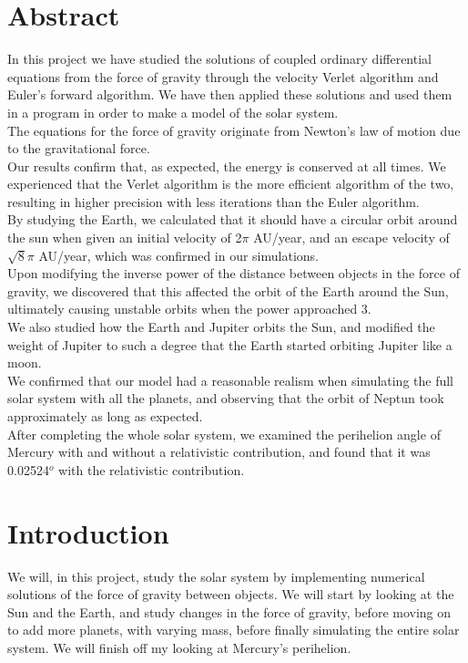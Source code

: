 \documentclass{article}
\begin{document}
\section*{Abstract}
    In this project we have studied the solutions of coupled ordinary differential equations from the force of gravity through the velocity Verlet algorithm and Euler's forward algorithm. We have then applied these solutions and used them in a program in order to make a model of the solar system.\\
    The equations for the force of gravity originate from Newton's law of motion due to the gravitational force.\\
    Our results confirm that, as expected, the energy is conserved at all times. We experienced that the Verlet algorithm is the more efficient algorithm of the two, resulting in higher precision with less iterations than the Euler algorithm.\\
    By studying the Earth, we calculated that it should have a circular orbit around the sun when given an initial velocity of 2$\pi$ AU/year, and an escape velocity of $\sqrt{8}\pi$ AU/year, which was confirmed in our simulations.\\
    Upon modifying the inverse power of the distance between objects in the force of gravity, we discovered that this affected the orbit of the Earth around the Sun, ultimately causing unstable orbits when the power approached 3.\\
    We also studied how the Earth and Jupiter orbits the Sun, and modified the weight of Jupiter to such a degree that the Earth started orbiting Jupiter like a moon.\\
    We confirmed that our model had a reasonable realism when simulating the full solar system with all the planets, and observing that the orbit of Neptun took approximately as long as expected.\\
    After completing the whole solar system, we examined the perihelion angle of Mercury with and without a relativistic contribution, and found that it was 0.02524$^o$ with the relativistic contribution.

\tableofcontents

\newpage

\section{Introduction}
    We will, in this project, study the solar system by implementing numerical solutions of the force of gravity between objects. We will start by looking at the Sun and the Earth, and study changes in the force of gravity, before moving on to add more planets, with varying mass, before finally simulating the entire solar system. We will finish off my looking at Mercury's perihelion.
\end{document}

